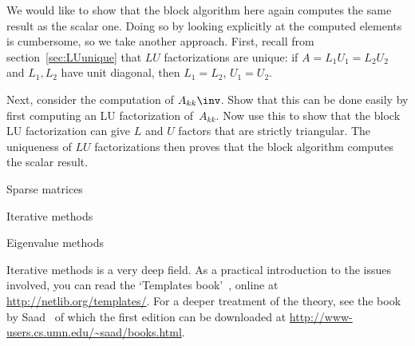 \begin{exercise}
  We would like to show that the block algorithm here again computes
  the same result as the scalar one. Doing so by looking explicitly at
  the computed elements is cumbersome, so we take another
  approach.  First, recall from section~\ref{sec:LUunique} that $LU$ factorizations are unique: if
  $A=L_1U_1=L_2U_2$ and $L_1,L_2$ have unit diagonal, then $L_1=L_2$,
  $U_1=U_2$.

  Next, consider the computation of $A_{kk}\inv$. Show that this can
  be done easily by first computing an LU factorization
  of~$A_{kk}$. Now use this to show that the block LU factorization
  can give $L$ and $U$ factors that are strictly triangular. The
  uniqueness of $LU$ factorizations then proves that the block
  algorithm computes the scalar result.
\end{exercise}


 {Sparse matrices}
\label{sec:sparse}


 {Iterative methods}
\label{sec:iterative}





 {Eigenvalue methods}
\label{sec:eigen}


\furtherreading

Iterative methods is a very deep field. As a practical introduction to
the issues involved, you can read the `Templates
book'~\cite{Ba:templates}, online at
\url{http://netlib.org/templates/}. For a deeper treatment of the
theory, see the book by Saad~\cite{saad96} of which the first edition
can be downloaded at
\url{http://www-users.cs.umn.edu/~saad/books.html}.
